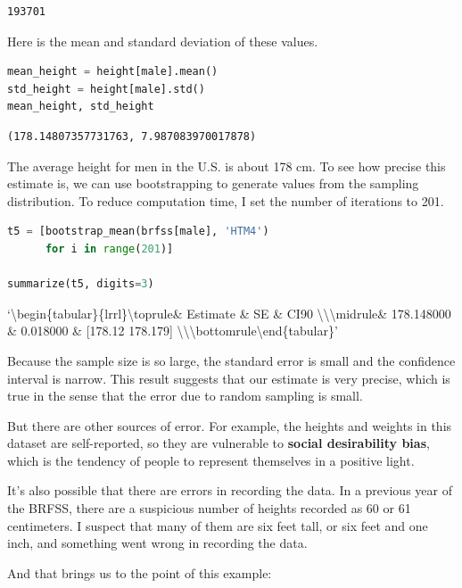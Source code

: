 \begin{lstlisting}[style=output]
193701
\end{lstlisting}

Here is the mean and standard deviation of these values.

\begin{lstlisting}[language=Python,style=source]
mean_height = height[male].mean()
std_height = height[male].std()
mean_height, std_height
\end{lstlisting}

\begin{lstlisting}[style=output]
(178.14807357731763, 7.987083970017878)
\end{lstlisting}

The average height for men in the U.S. is about 178 cm. To see how
precise this estimate is, we can use bootstrapping to generate values
from the sampling distribution. To reduce computation time, I set the
number of iterations to 201.

\begin{lstlisting}[language=Python,style=source]
t5 = [bootstrap_mean(brfss[male], 'HTM4')
      for i in range(201)]

summarize(t5, digits=3)
\end{lstlisting}

`\textbackslash begin\{tabular\}\{lrrl\}\n\textbackslash toprule\n \&
Estimate \& SE \& CI90
\textbackslash\textbackslash{}\n\textbackslash midrule\n \& 178.148000
\& 0.018000 \& {[}178.12 178.179{]}
\textbackslash\textbackslash{}\n\textbackslash bottomrule\n\textbackslash end\{tabular\}\n'

Because the sample size is so large, the standard error is small and the
confidence interval is narrow. This result suggests that our estimate is
very precise, which is true in the sense that the error due to random
sampling is small.

But there are other sources of error. For example, the heights and
weights in this dataset are self-reported, so they are vulnerable to
\textbf{social desirability bias}, which is the tendency of people to
represent themselves in a positive light.

It's also possible that there are errors in recording the data. In a
previous year of the BRFSS, there are a suspicious number of heights
recorded as 60 or 61 centimeters. I suspect that many of them are six
feet tall, or six feet and one inch, and something went wrong in
recording the data.

And that brings us to the point of this example:

